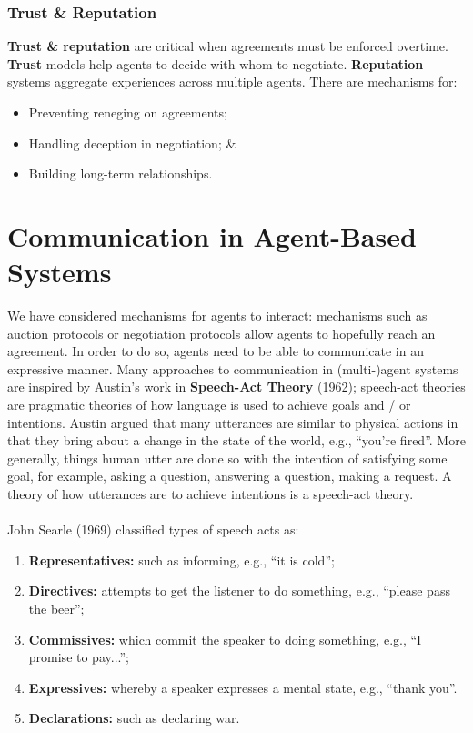 \documentclass[a4paper,11pt]{article}
\begin{document}
\subsubsection{Trust \& Reputation}
\textbf{Trust \& reputation} are critical when agreements must be enforced overtime.
\textbf{Trust} models help agents to decide with whom to negotiate.
\textbf{Reputation} systems aggregate experiences across multiple agents.
There are mechanisms for:
\begin{itemize}
    \item   Preventing reneging on agreements;
    \item   Handling deception in negotiation; \&
    \item   Building long-term relationships.
\end{itemize}

\section{Communication in Agent-Based Systems}
We have considered mechanisms for agents to interact:
mechanisms such as auction protocols or negotiation protocols allow agents to hopefully reach an agreement.
In order to do so, agents need to be able to communicate in an expressive manner.
Many approaches to communication in (multi-)agent systems are inspired by Austin's work in \textbf{Speech-Act Theory} (1962);
speech-act theories are pragmatic theories of how language is used to achieve goals and / or intentions.
Austin argued that many utterances are similar to physical actions in that they bring about a change in the state of the world, e.g., ``you're fired''.
More generally, things human utter are done so with the intention of satisfying some goal, for example, asking a question, answering a question, making a request.
A theory of how utterances are to achieve intentions is a speech-act theory.
\\\\
John Searle (1969) classified types of speech acts as:
\begin{enumerate}
    \item   \textbf{Representatives:} such as informing, e.g., ``it is cold'';
    \item   \textbf{Directives:} attempts to get the listener to do something, e.g., ``please pass the beer'';
    \item   \textbf{Commissives:} which commit the speaker to doing something, e.g., ``I promise to pay...'';
    \item   \textbf{Expressives:} whereby a speaker expresses a mental state, e.g., ``thank you''.
    \item   \textbf{Declarations:} such as declaring war.
\end{enumerate}
\end{document}
